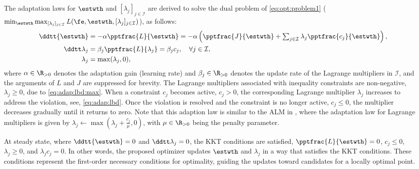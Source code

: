 \documentclass[lettersize,journal]{IEEEtran}
\begin{document}
The adaptation laws for $\estwth$ and $[\lambda_j]_{j\in\mathcal I}$ are derived to solve the dual problem of \eqref{eq:opt:problem1} (\ie  $\min_{\estwth} \max_{[\lambda_j]_{j\in\mathcal I}}L(\fe,\estwth,[\lambda_j]_{j\in\mathcal I})$), as follows:
\begin{subequations}
    \begin{align}
            \ddtt{\estwth}
            &
            =
            -\alpha \pptfrac{L}{\estwth}
            =
            -\alpha 
            \left(
                \pptfrac{J}{\estwth}
                +
                \textstyle\sum_{j\in\mathcal{I}}
                \lambda_j 
                \pptfrac{c_j}{\estwth}
            \right),
        \label{eq:adap:th}
            \\
            \ddtt\lambda_j
            & 
            = 
            \beta_j\pptfrac{L}{\lambda_j} 
            = 
            \beta_j c_j ,
            \quad \forall j\in\mathcal I,
        \label{eq:adap:lbd}
            \\
            \lambda_j & = \max(\lambda_j,0) ,
        \label{eq:adap:lbd:max}
    \end{align}
    \label{eq:adaptation law}%
\end{subequations}
where $\alpha\in\R_{>0}$ denotes the adaptation gain (learning rate) and $\beta_j\in\R_{>0}$ denotes the update rate of the Lagrange multipliers in $\mathcal I$, and the arguments of $L$ and $J$ are suppressed for brevity. 
The Lagrange multipliers associated with inequality constraints are non-negative, \ie $\lambda_j\ge 0$, due to \eqref{eq:adap:lbd:max}. 
When a constraint $c_j$ becomes active, \ie $c_j > 0$, the corresponding Lagrange multiplier $\lambda_j$ increases to address the violation, \ie see, \eqref{eq:adap:lbd}.
Once the violation is resolved and the constraint is no longer active, \ie $c_j \le 0$, the multiplier decreases gradually until it returns to zero.
Note that this adaption law is similar to the ALM in \cite{Nocedal:2006aa}, where the adaptation law for Lagrange multipliers is given by $\lambda_j\leftarrow \max\left(\lambda_j+\tfrac{c_j}{\mu},0\right)$, with $\mu\in\R_{>0}$ being the penalty parameter. 

At steady state, where $\ddtt{\estwth}=0$ and $\ddtt\lambda_j=0$, the KKT conditions are satisfied, \ie $\pptfrac{L}{\estwth}=0$, $c_j \le 0$, $\lambda_j \ge 0$, and $\lambda_j c_j=0$.
In other words, the proposed optimizer updates $\estwth$ and $\lambda_j$ in a way that satisfies the KKT conditions. 
These conditions represent the first-order necessary conditions for optimality, guiding the updates toward candidates for a locally optimal point.
\end{document}
